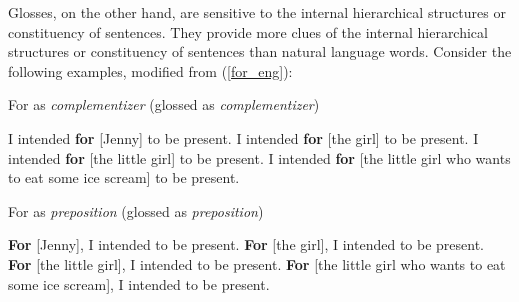 \documentclass[final]{ua-thesis}
\begin{document}


Glosses, on the other hand, are sensitive to the internal hierarchical structures or constituency of sentences. They provide more clues of the internal hierarchical structures or constituency of sentences than natural language words. Consider the following examples, modified from (\ref{for_eng}):

\begin{exe}
\ex
For as \textit{complementizer} (glossed as \textit{complementizer})
	\begin{xlist}
	\ex I intended \textbf{for} [Jenny] to be present.
	\ex I intended \textbf{for} [the girl] to be present.
	\ex I intended \textbf{for} [the little girl] to be present.
	\ex I intended \textbf{for} [the little girl who wants to eat some ice scream] to be present. 
	\end{xlist}
\ex
For as \textit{preposition} (glossed as \textit{preposition})
	\begin{xlist}
	\ex \textbf{For} [Jenny], I intended to be present. 
	\ex \textbf{For} [the girl], I intended to be present. 
	\ex \textbf{For} [the little girl], I intended to be present. 
	\ex \textbf{For} [the little girl who wants to eat some ice scream], I intended to be present. 
	\end{xlist}
\end{exe}
\end{document}
